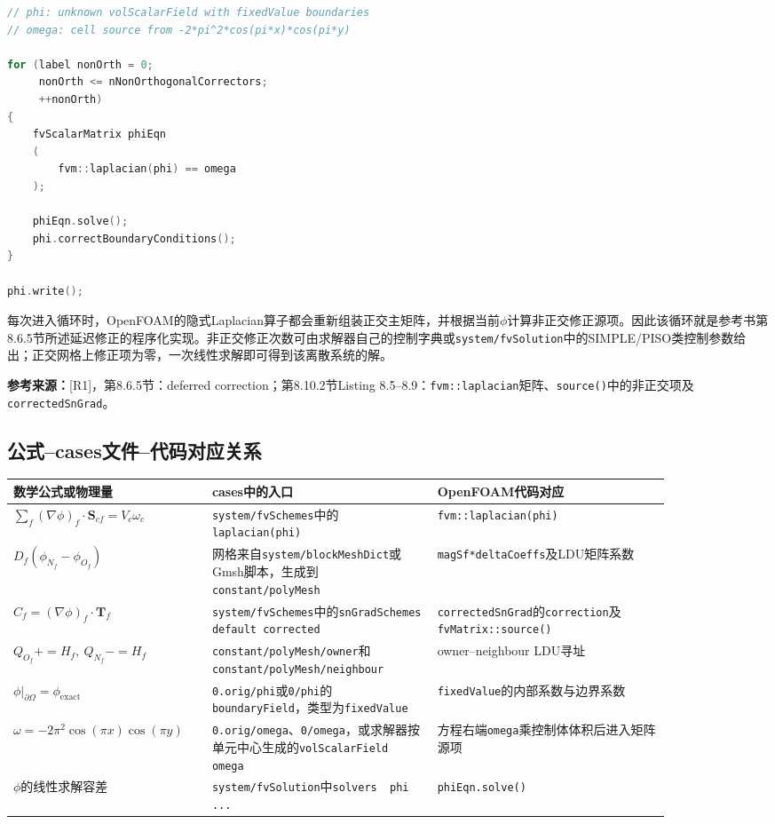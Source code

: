 \documentclass[UTF8,12pt,a4paper]{ctexart}
\numberwithin{equation}{section}
\newcommand{\Rone}{\textnormal{[R1]}}
\newcommand{\source}[1]{%
  \par\smallskip
  \noindent\colorbox{sourcebg}{%
    \parbox{0.955\linewidth}{\footnotesize\color{sourcegray}\textbf{参考来源：}#1}%
  }
  \par\smallskip
}
\begin{document}
\begin{lstlisting}[style=foam,language=C++]
// phi: unknown volScalarField with fixedValue boundaries
// omega: cell source from -2*pi^2*cos(pi*x)*cos(pi*y)

for (label nonOrth = 0;
     nonOrth <= nNonOrthogonalCorrectors;
     ++nonOrth)
{
    fvScalarMatrix phiEqn
    (
        fvm::laplacian(phi) == omega
    );

    phiEqn.solve();
    phi.correctBoundaryConditions();
}

phi.write();
\end{lstlisting}

每次进入循环时，OpenFOAM的隐式Laplacian算子都会重新组装正交主矩阵，并根据当前$\phi$计算非正交修正源项。因此该循环就是参考书第8.6.5节所述延迟修正的程序化实现。非正交修正次数可由求解器自己的控制字典或\texttt{system/fvSolution}中的SIMPLE/PISO类控制参数给出；正交网格上修正项为零，一次线性求解即可得到该离散系统的解。

\source{\Rone，第8.6.5节：deferred correction；第8.10.2节Listing 8.5--8.9：\texttt{fvm::laplacian}矩阵、\texttt{source()}中的非正交项及\texttt{correctedSnGrad}。}

\subsection{公式--cases文件--代码对应关系}

\small
\begin{longtable}{>{\raggedright\arraybackslash}p{0.23\linewidth}>{\raggedright\arraybackslash}p{0.31\linewidth}>{\raggedright\arraybackslash}p{0.32\linewidth}}
\toprule
数学公式或物理量 & cases中的入口 & OpenFOAM代码对应\\
\midrule
$\sum_f(\nabla\phi)_f\cdot\bm S_{cf}=V_c\omega_c$
& \texttt{system/fvSchemes}中的\texttt{laplacian(phi)}
& \texttt{fvm::laplacian(phi)}\\
$D_f(\phi_{N_f}-\phi_{O_f})$
& 网格来自\texttt{system/blockMeshDict}或Gmsh脚本，生成到\texttt{constant/polyMesh}
& \texttt{magSf*deltaCoeffs}及LDU矩阵系数\\
$C_f=(\nabla\phi)_f\cdot\bm T_f$
& \texttt{system/fvSchemes}中的\texttt{snGradSchemes default corrected}
& \texttt{correctedSnGrad}的\texttt{correction}及\texttt{fvMatrix::source()}\\
$Q_{O_f}{+}{=}H_f,\ Q_{N_f}{-}{=}H_f$
& \texttt{constant/polyMesh/owner}和\texttt{constant/polyMesh/neighbour}
& owner--neighbour LDU寻址\\
$\phi|_{\partial\Omega}=\phi_{\mathrm{exact}}$
& \texttt{0.orig/phi}或\texttt{0/phi}的\texttt{boundaryField}，类型为\texttt{fixedValue}
& \texttt{fixedValue}的内部系数与边界系数\\
$\omega=-2\pi^2\cos(\pi x)\cos(\pi y)$
& \texttt{0.orig/omega}、\texttt{0/omega}，或求解器按单元中心生成的\texttt{volScalarField omega}
& 方程右端\texttt{omega}乘控制体体积后进入矩阵源项\\
$\phi$的线性求解容差
& \texttt{system/fvSolution}中\texttt{solvers { phi ... }}
& \texttt{phiEqn.solve()}\\
\bottomrule
\end{longtable}
\normalsize
\end{document}
